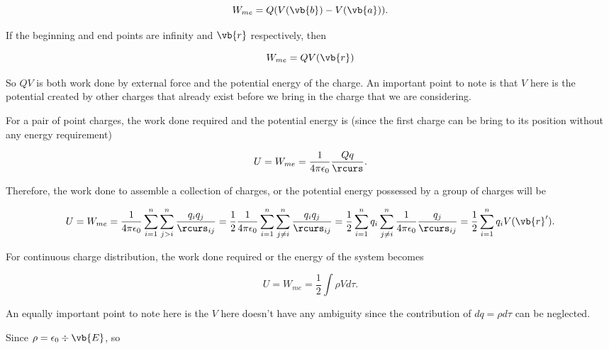 \documentclass[a4paper,12pt]{report}
\begin{document}
	\begin{equation}
		W_{me}  = Q(V(\vb{b} ) - V(\vb{a} )) .
	\end{equation}
	
	If the beginning and end points are infinity and \(\vb{r} \) respectively, then
	
	\begin{equation}
		W_{me}  = QV(\vb{r} )
	\end{equation}
	
	So \(QV\) is both work done by external force and the potential energy of the charge. An important point to note is that \(V\) here is the potential created by other charges that already exist before we bring in the charge that we are considering.
	
	
	For a pair of point charges, the work done required and the potential energy is (since the first charge can be bring to its position without any energy requirement)
	
	\begin{equation}
		U = W_{me} = \frac{1}{4\pi\epsilon_0} \frac{Qq}{\rcurs } . \label{energy1} 
	\end{equation}
	
	
	Therefore, the work done to assemble a collection of charges, or the potential energy possessed by a group of charges will be
	
	\begin{equation}
		U = W_{me} = \frac{1}{4\pi\epsilon_0} \sum_{i=1}^{n} \sum_{j>i}^{n} \frac{q_{i} q_{j} }{\rcurs _{ij} }  = \frac{1}{2} \frac{1}{4\pi\epsilon_0} \sum_{i=1}^{n} \sum_{j\neq i}^{n} \frac{q_{i} q_{j} }{\rcurs _{ij} } = \frac{1}{2} \sum_{i=1}^{n} q_{i} \sum_{j\neq i}^{n} \frac{1}{4\pi\epsilon_0} \frac{q_{j} }{\rcurs _{ij} } = \frac{1}{2} \sum_{i=1}^{n} q_{i} V(\vb{r} '). \label{energy2} 
	\end{equation}
	
	For continuous charge distribution, the work done required or the energy of the system becomes
	
	\begin{equation}
		U = W_{me} = \frac{1}{2} \int \rho V d\tau. \label{energy3} 
	\end{equation}
	
	An equally important point to note here is the \(V\) here doesn't have any ambiguity since the contribution of \(dq = \rho  d\tau \) can be neglected.
	
	
	
	Since \(\rho  = \epsilon_0 \div{\vb{E} } \), so 
	
\end{document}
